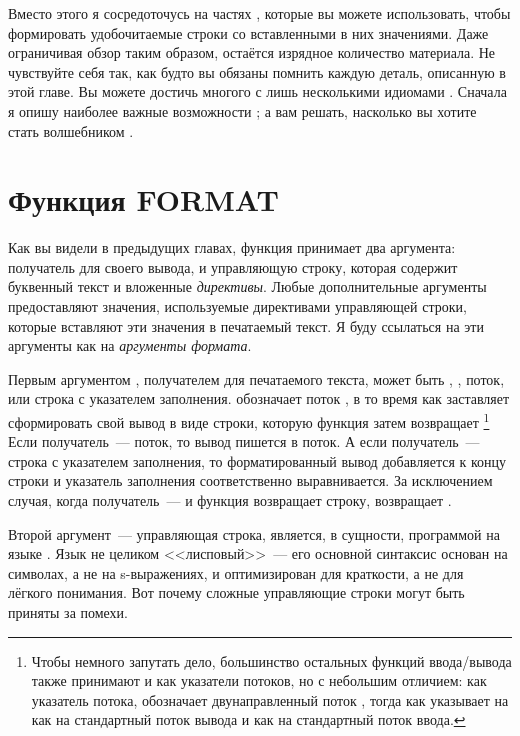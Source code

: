 Вместо этого я сосредоточусь на частях , которые вы можете использовать,
чтобы формировать удобочитаемые строки со вставленными в них значениями. Даже ограничивая
обзор таким образом, остаётся изрядное количество материала. Не чувствуйте себя так, как
будто вы обязаны помнить каждую деталь, описанную в этой главе. Вы можете достичь многого
с лишь несколькими идиомами . Сначала я опишу наиболее важные возможности
; а вам решать, насколько вы хотите стать волшебником .
 
\section{Функция FORMAT}

Как вы видели в предыдущих главах, функция  принимает два аргумента:
получатель для своего вывода, и управляющую строку, которая содержит буквенный текст и
вложенные \textit{директивы}. Любые дополнительные аргументы предоставляют значения,
используемые директивами управляющей строки, которые вставляют эти значения в печатаемый
текст. Я буду ссылаться на эти аргументы как на \textit{аргументы формата}.

Первым аргументом , получателем для печатаемого текста, может быть ,
, поток, или строка с указателем заполнения.  обозначает поток
, в то время как  заставляет  сформировать
свой вывод в виде строки, которую функция затем возвращает \footnote{Чтобы немного
  запутать дело, большинство остальных функций ввода/вывода также принимают  и
   как указатели потоков, но с небольшим отличием: как указатель потока,
   обозначает двунаправленный поток , тогда как 
  указывает на  как на стандартный поток вывода и
   как на стандартный поток ввода.} Если получатель~--- поток, то
вывод пишется в поток. А если получатель~--- строка с указателем заполнения, то
форматированный вывод добавляется к концу строки и указатель заполнения соответственно
выравнивается. За исключением случая, когда получатель~---  и функция возвращает
строку,  возвращает .

Второй аргумент~--- управляющая строка, является, в сущности, программой на языке
. Язык  не целиком <<лисповый>>~--- его основной синтаксис основан
на символах, а не на s-выражениях, и оптимизирован для краткости, а не для лёгкого
понимания. Вот почему сложные управляющие строки  могут быть приняты за
помехи.

